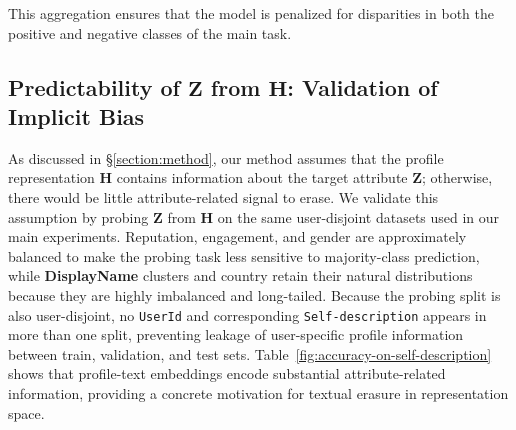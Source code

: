 \documentclass[11pt]{article}
\newcommand{\rv}[1]{\mathbf{#1}}
\begin{document}
This aggregation ensures that the model is penalized for disparities in both the positive and negative classes of the main task.



\subsection{Predictability of $\rv{Z}$ from $\rv{H}$: Validation of Implicit Bias}

\label{sec:validation}








As discussed in \S\ref{section:method}, our method assumes that the profile representation $\rv{H}$ contains information about the target attribute $\rv{Z}$; otherwise, there would be little attribute-related signal to erase. We validate this assumption by probing $\rv{Z}$ from $\rv{H}$ on the same user-disjoint datasets used in our main experiments. Reputation, engagement, and gender are approximately balanced to make the probing task less sensitive to majority-class prediction, while \textbf{DisplayName} clusters and country retain their natural distributions because they are highly imbalanced and long-tailed. Because the probing split is also user-disjoint, no \texttt{UserId} and corresponding \texttt{Self-description} appears in more than one split, preventing leakage of user-specific profile information between train, validation, and test sets. Table~\ref{fig:accuracy-on-self-description} shows that profile-text embeddings encode substantial attribute-related information, providing a concrete motivation for textual erasure in representation space.
\end{document}
